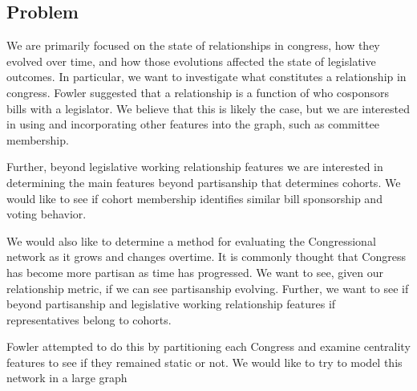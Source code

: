 \subsection{Problem}

We are primarily focused on the state of relationships in congress, how 
they evolved over time, and how those evolutions affected the state of 
legislative outcomes. In particular, we want to investigate what constitutes a 
relationship in congress. Fowler suggested that a relationship is a function 
of who cosponsors bills with a legislator. We believe that this is likely the 
case, but we are interested in using and incorporating other features into 
the graph, such as committee membership. 

Further, beyond legislative working relationship features we are interested in 
determining the main features beyond partisanship that determines cohorts. We 
would like to see if cohort membership identifies similar bill sponsorship and 
voting behavior.

We would also like to determine a method for evaluating the Congressional 
network as it grows and changes overtime. It is commonly thought that Congress 
has become more partisan as time has progressed. We want to see, given our 
relationship metric, if we can see partisanship evolving. Further, we want to 
see if beyond partisanship and legislative working relationship features if 
representatives belong to cohorts.

 Fowler attempted to do this by 
partitioning each Congress and examine centrality features to see if they 
remained static or not. We would like to try to model this network in a 
large graph